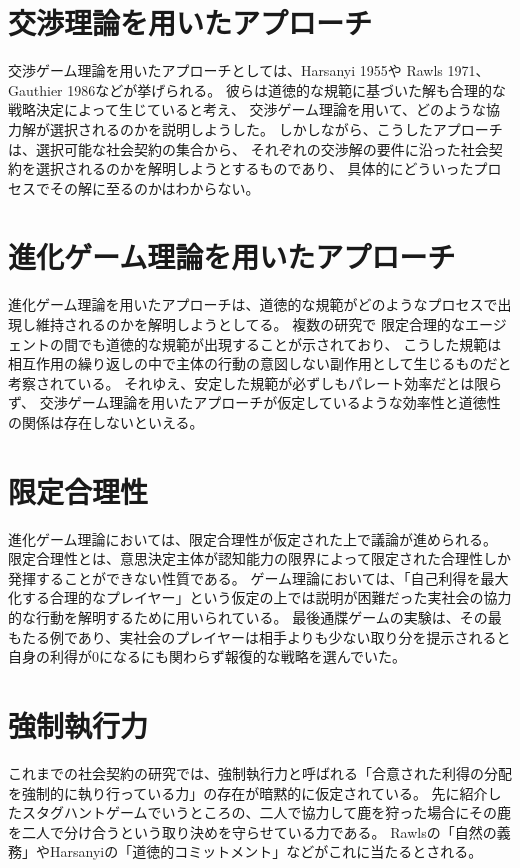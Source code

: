 \section{交渉理論を用いたアプローチ}
\label{bargaining-theory}
交渉ゲーム理論を用いたアプローチとしては、Harsanyi 1955\cite{harsanyi1955}や
Rawls 1971\cite{rawls1971}、Gauthier 1986\cite{gauthier1986}などが挙げられる。
彼らは道徳的な規範に基づいた解も合理的な戦略決定によって生じていると考え、
交渉ゲーム理論を用いて、どのような協力解が選択されるのかを説明しようした。
しかしながら、こうしたアプローチは、選択可能な社会契約の集合から、
それぞれの交渉解の要件に沿った社会契約を選択されるのかを解明しようとするものであり、
具体的にどういったプロセスでその解に至るのかはわからない。

\section{進化ゲーム理論を用いたアプローチ}
\label{evolutionary-game-theory}
進化ゲーム理論を用いたアプローチは、道徳的な規範がどのようなプロセスで出現し維持されるのかを解明しようとしてる。
複数の研究で\cite{sugden1986}\cite{binmore1994}\cite{binmore1998}\cite{skyrms1996}
限定合理的なエージェントの間でも道徳的な規範が出現することが示されており、
こうした規範は相互作用の繰り返しの中で主体の行動の意図しない副作用として生じるものだと考察されている。
それゆえ、安定した規範が必ずしもパレート効率だとは限らず、
交渉ゲーム理論を用いたアプローチが仮定しているような効率性と道徳性の関係は存在しないといえる。\cite{sep-game-ethics}

\section{限定合理性}
進化ゲーム理論においては、限定合理性が仮定された上で議論が進められる。
限定合理性とは、意思決定主体が認知能力の限界によって限定された合理性しか発揮することができない性質である。\cite{simon1947}
ゲーム理論においては、「自己利得を最大化する合理的なプレイヤー」という仮定の上では説明が困難だった実社会の協力的な行動を解明するために用いられている。\cite{sep-bounded-rationality}
最後通牒ゲームの実験は、その最もたる例であり、実社会のプレイヤーは相手よりも少ない取り分を提示されると自身の利得が0になるにも関わらず報復的な戦略を選んでいた。\cite{GUTH1982367}

\section{強制執行力}
これまでの社会契約の研究では、強制執行力と呼ばれる「合意された利得の分配を強制的に執り行っている力」の存在が暗黙的に仮定されている。
先に紹介したスタグハントゲームでいうところの、二人で協力して鹿を狩った場合にその鹿を二人で分け合うという取り決めを守らせている力である。
Rawlsの「自然の義務」\cite{rawls1971}やHarsanyiの「道徳的コミットメント」\cite{harsanyi1955}などがこれに当たるとされる。\cite{binmore2005}

